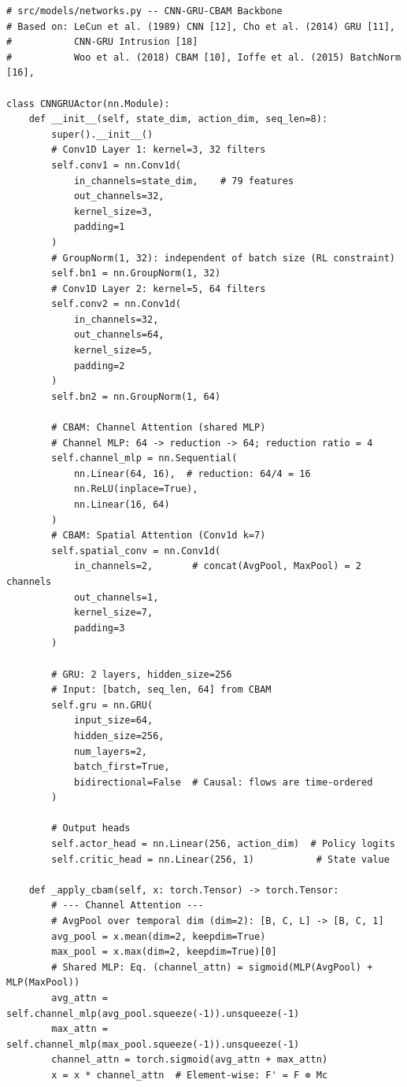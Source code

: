 \documentclass[12pt,a4paper]{article}
\begin{document}
\begin{lstlisting}[caption=CNN-GRU-CBAM Backbone Implementation, label=lst:backbone]
# src/models/networks.py -- CNN-GRU-CBAM Backbone
# Based on: LeCun et al. (1989) CNN [12], Cho et al. (2014) GRU [11],
#           CNN-GRU Intrusion [18]
#           Woo et al. (2018) CBAM [10], Ioffe et al. (2015) BatchNorm [16],

class CNNGRUActor(nn.Module):
    def __init__(self, state_dim, action_dim, seq_len=8):
        super().__init__()
        # Conv1D Layer 1: kernel=3, 32 filters
        self.conv1 = nn.Conv1d(
            in_channels=state_dim,    # 79 features
            out_channels=32,
            kernel_size=3,
            padding=1
        )
        # GroupNorm(1, 32): independent of batch size (RL constraint)
        self.bn1 = nn.GroupNorm(1, 32)
        # Conv1D Layer 2: kernel=5, 64 filters
        self.conv2 = nn.Conv1d(
            in_channels=32,
            out_channels=64,
            kernel_size=5,
            padding=2
        )
        self.bn2 = nn.GroupNorm(1, 64)

        # CBAM: Channel Attention (shared MLP)
        # Channel MLP: 64 -> reduction -> 64; reduction ratio = 4
        self.channel_mlp = nn.Sequential(
            nn.Linear(64, 16),  # reduction: 64/4 = 16
            nn.ReLU(inplace=True),
            nn.Linear(16, 64)
        )
        # CBAM: Spatial Attention (Conv1d k=7)
        self.spatial_conv = nn.Conv1d(
            in_channels=2,       # concat(AvgPool, MaxPool) = 2 channels
            out_channels=1,
            kernel_size=7,
            padding=3
        )

        # GRU: 2 layers, hidden_size=256
        # Input: [batch, seq_len, 64] from CBAM
        self.gru = nn.GRU(
            input_size=64,
            hidden_size=256,
            num_layers=2,
            batch_first=True,
            bidirectional=False  # Causal: flows are time-ordered
        )

        # Output heads
        self.actor_head = nn.Linear(256, action_dim)  # Policy logits
        self.critic_head = nn.Linear(256, 1)           # State value

    def _apply_cbam(self, x: torch.Tensor) -> torch.Tensor:
        # --- Channel Attention ---
        # AvgPool over temporal dim (dim=2): [B, C, L] -> [B, C, 1]
        avg_pool = x.mean(dim=2, keepdim=True)
        max_pool = x.max(dim=2, keepdim=True)[0]
        # Shared MLP: Eq. (channel_attn) = sigmoid(MLP(AvgPool) + MLP(MaxPool))
        avg_attn = self.channel_mlp(avg_pool.squeeze(-1)).unsqueeze(-1)
        max_attn = self.channel_mlp(max_pool.squeeze(-1)).unsqueeze(-1)
        channel_attn = torch.sigmoid(avg_attn + max_attn)
        x = x * channel_attn  # Element-wise: F' = F ⊗ Mc


\end{lstlisting}
\end{document}

